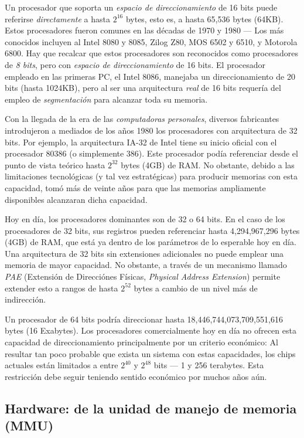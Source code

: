 \documentclass[11pt,fleqn]{book} %
\begin{document}
Un procesador que soporta un \emph{espacio de direccionamiento} de 16 bits
puede referirse \emph{directamente} a hasta $2^{16}$ bytes, esto es, a
hasta 65,536 bytes (64KB). Estos procesadores fueron comunes en las
décadas de 1970 y 1980 — Los más conocidos incluyen al Intel 8080 y
8085, Zilog Z80, MOS 6502 y 6510, y Motorola 6800. Hay que recalcar
que estos procesadores son reconocidos como procesadores de \emph{8 bits},
pero con \emph{espacio de direccionamiento} de 16 bits. El procesador
empleado en las primeras PC, el Intel 8086, manejaba un
direccionamiento de 20 bits (hasta 1024KB), pero al ser una
arquitectura \emph{real} de 16 bits requería del empleo de \emph{segmentación}
para alcanzar toda su memoria.

Con la llegada de la era de las \emph{computadoras personales}, diversos
fabricantes introdujeron a mediados de los años 1980 los procesadores
con arquitectura de 32 bits. Por ejemplo, la arquitectura IA-32 de Intel tiene su 
inicio oficial con el procesador 80386 (o simplemente 386). 
Este procesador podía referenciar desde el punto de vista teórico 
hasta $2^{32}$ bytes (4GB) de RAM. No obstante, debido a las 
limitaciones tecnológicas (y tal vez estratégicas) para producir 
memorias con esta capacidad, tomó más de veinte años para que las 
memorias ampliamente disponibles alcanzaran dicha capacidad.

Hoy en día, los procesadores dominantes son de 32 o 64 bits. En el caso de
los procesadores de 32 bits, sus registros pueden referenciar hasta
4,294,967,296 bytes (4GB) de RAM, que está ya dentro de los 
parámetros de lo esperable hoy en día. Una arquitectura de 
32 bits sin extensiones adicionales no puede emplear una memoria 
de mayor capacidad. No obstante, a través de un mecanismo llamado \emph{PAE}
(Extensión de Direcciónes Físicas, \emph{Physical Address Extension})
permite extender esto a rangos de hasta $2^{52}$ bytes a cambio de 
un nivel más de indirección.

Un procesador de 64 bits podría direccionar hasta
18,446,744,073,709,551,616 bytes (16 Exabytes). Los procesadores
comercialmente hoy en día no ofrecen esta capacidad de
direccionamiento principalmente por un criterio económico: Al resultar
tan poco probable que exista un sistema con estas capacidades, los
chips actuales están limitados a entre $2^{40}$ y $2^{48}$ bits — 1 y
256 terabytes. Esta restricción debe seguir teniendo sentido económico
por muchos años aún.
\subsection{Hardware: de la unidad de manejo de memoria (MMU)}
\label{sec-5-1-2}
\end{document}
